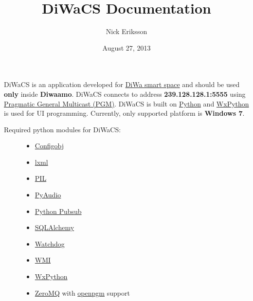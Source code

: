 \documentclass[letterpaper,10pt,english]{sphinxmanual}
\title{DiWaCS Documentation}
\date{August 27, 2013}
\author{Nick Eriksson}
\begin{document}
\maketitle
\tableofcontents
{}\label{index::doc}


DiWaCS is an application developed for \href{https://cse.aalto.fi/research/groups/stratus/research/research-projects/}{DiWa smart space}
and should be used \textbf{only} inside \textbf{Diwaamo}.
DiWaCS connects to address \textbf{239.128.128.1:5555} using \href{http://code.google.com/p/openpgm/}{Pragmatic General Multicast (PGM)}.
DiWaCS is built on \href{http://www.python.org}{Python} and \href{http://www.wxpython.org}{WxPython} is used for UI programming.
Currently, only supported platform is \textbf{Windows 7}.
\begin{description}
\item[{Required python modules for DiWaCS:}] \leavevmode\begin{itemize}
\item {} 
\href{http://www.voidspace.org.uk/python/configobj.html}{Configobj}

\item {} 
\href{http://pypi.python.org/pypi/lxml/}{lxml}

\item {} 
\href{http://www.pythonware.com/products/pil/}{PIL}

\item {} 
\href{http://pypi.python.org/pypi/PyAudio}{PyAudio}

\item {} 
\href{http://pubsub.sourceforge.net/}{Python Pubsub}

\item {} 
\href{http://www.sqlalchemy.org/}{SQLAlchemy}

\item {} 
\href{http://packages.python.org/watchdog/}{Watchdog}

\item {} 
\href{http://pypi.python.org/pypi/WMI/1.4.9/}{WMI}

\item {} 
\href{http://www.wxpython.org}{WxPython}

\item {} 
\href{http://zeromq.org}{ZeroMQ} with \href{http://code.google.com/p/openpgm/}{openpgm} support

\end{itemize}

\end{description}
\end{document}
